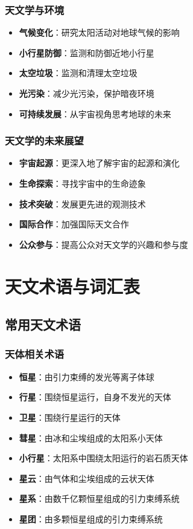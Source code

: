 \documentclass[12pt,UTF8]{ctexbook}
\begin{document}
\section{天文学与环境}

\begin{itemize}
  \item \textbf{气候变化}：研究太阳活动对地球气候的影响
  \item \textbf{小行星防御}：监测和防御近地小行星
  \item \textbf{太空垃圾}：监测和清理太空垃圾
  \item \textbf{光污染}：减少光污染，保护暗夜环境
  \item \textbf{可持续发展}：从宇宙视角思考地球的未来
\end{itemize}

\section{天文学的未来展望}

\begin{itemize}
  \item \textbf{宇宙起源}：更深入地了解宇宙的起源和演化
  \item \textbf{生命探索}：寻找宇宙中的生命迹象
  \item \textbf{技术突破}：发展更先进的观测技术
  \item \textbf{国际合作}：加强国际天文合作
  \item \textbf{公众参与}：提高公众对天文学的兴趣和参与度
\end{itemize}

\part{天文术语与词汇表}

\chapter{常用天文术语}
\section{天体相关术语}

\begin{itemize}
  \item \textbf{恒星}：由引力束缚的发光等离子体球
  \item \textbf{行星}：围绕恒星运行，自身不发光的天体
  \item \textbf{卫星}：围绕行星运行的天体
  \item \textbf{彗星}：由冰和尘埃组成的太阳系小天体
  \item \textbf{小行星}：太阳系中围绕太阳运行的岩石质天体
  \item \textbf{星云}：由气体和尘埃组成的云状天体
  \item \textbf{星系}：由数千亿颗恒星组成的引力束缚系统
  \item \textbf{星团}：由多颗恒星组成的引力束缚系统
\end{itemize}
\end{document}
